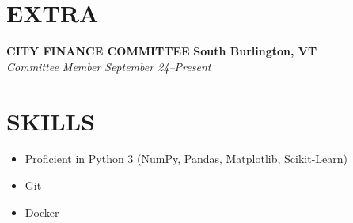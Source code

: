 \documentclass[11pt,letterpaper]{article}
\newcommand{\role}[4]{
  \begin{center}
  \textbf{#1} \hfill \textbf{#2} \\
  \textit{#3} \hfill \textit{#4}
  \end{center}
}
\begin{document}
\section{EXTRA}
\vspace{1em}
\role{CITY FINANCE COMMITTEE}{South Burlington, VT}{Committee Member}{September 24--Present}

\vspace{1em}
\section{SKILLS}

\vspace{0.5em}
\begin{itemize}[leftmargin=*,nosep]
  \item Proficient in Python 3 (NumPy, Pandas, Matplotlib, Scikit-Learn)
  \item Git
  \item Docker 
\end{itemize}
\end{document}
